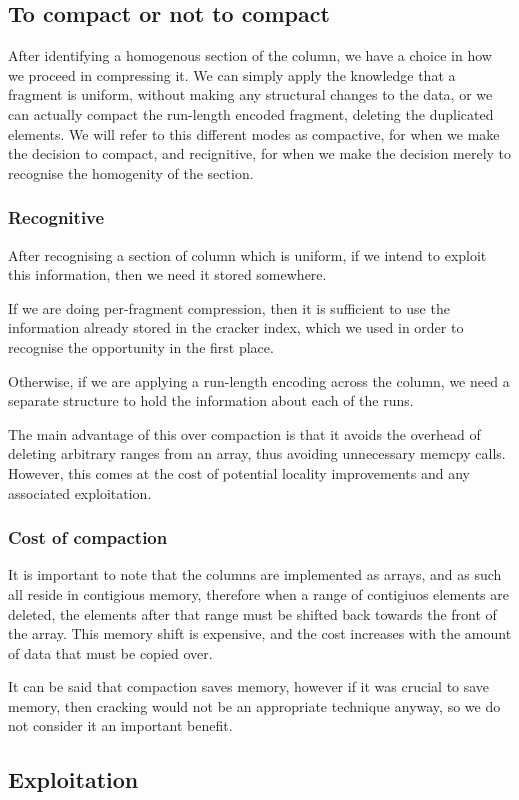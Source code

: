\subsection{To compact or not to compact}

After identifying a homogenous section of the column, we have a choice in how we proceed in
compressing it. We can simply apply the knowledge that a fragment is uniform, without making any
structural changes to the data, or we can actually compact the run-length encoded fragment, deleting
the duplicated elements. We will refer to this different modes as compactive, for when we make the
decision to compact, and recignitive, for when we make the decision merely to recognise the
homogenity of the section.

\subsubsection{Recognitive}

After recognising a section of column which is uniform, if we intend to exploit this information, then
we need it stored somewhere.

If we are doing per-fragment compression, then it is sufficient to use the information already stored
in the cracker index, which we used in order to recognise the opportunity in the first place.

Otherwise, if we are applying a run-length encoding across the column, we need a separate structure to
hold the information about each of the runs.

The main advantage of this over compaction is that it avoids the overhead of deleting arbitrary ranges
from an array, thus avoiding unnecessary memcpy calls. However, this comes at the cost of potential
locality improvements and any associated exploitation.

\subsubsection{Cost of compaction}

It is important to note that the columns are implemented as arrays, and as such all reside in
contigious memory, therefore when a range of contigiuos elements are deleted, the elements after
that range must be shifted back towards the front of the array. This memory shift is expensive,
and the cost increases with the amount of data that must be copied over.

It can be said that compaction saves memory, however if it was crucial to save memory, then cracking
would not be an appropriate technique anyway, so we do not consider it an important benefit.

\subsection{Exploitation}

\label{ss:compressionexploitation}
